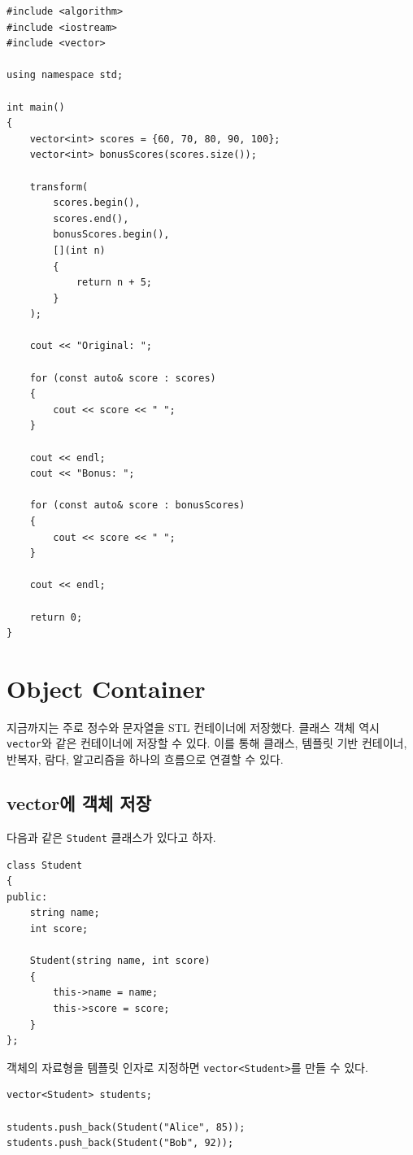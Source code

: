 \documentclass[11pt,a4paper]{article}
\begin{document}
\begin{lstlisting}
#include <algorithm>
#include <iostream>
#include <vector>

using namespace std;

int main()
{
    vector<int> scores = {60, 70, 80, 90, 100};
    vector<int> bonusScores(scores.size());

    transform(
        scores.begin(),
        scores.end(),
        bonusScores.begin(),
        [](int n)
        {
            return n + 5;
        }
    );

    cout << "Original: ";

    for (const auto& score : scores)
    {
        cout << score << " ";
    }

    cout << endl;
    cout << "Bonus: ";

    for (const auto& score : bonusScores)
    {
        cout << score << " ";
    }

    cout << endl;

    return 0;
}
\end{lstlisting}

\section{Object Container}
지금까지는 주로 정수와 문자열을 STL 컨테이너에 저장했다.
클래스 객체 역시 \texttt{vector}와 같은 컨테이너에 저장할 수 있다.
이를 통해 클래스, 템플릿 기반 컨테이너, 반복자, 람다, 알고리즘을 하나의 흐름으로 연결할 수 있다.

\subsection{vector에 객체 저장}
다음과 같은 \texttt{Student} 클래스가 있다고 하자.

\begin{lstlisting}
class Student
{
public:
    string name;
    int score;

    Student(string name, int score)
    {
        this->name = name;
        this->score = score;
    }
};
\end{lstlisting}

객체의 자료형을 템플릿 인자로 지정하면 \texttt{vector<Student>}를 만들 수 있다.

\begin{lstlisting}
vector<Student> students;

students.push_back(Student("Alice", 85));
students.push_back(Student("Bob", 92));
\end{lstlisting}
\end{document}
